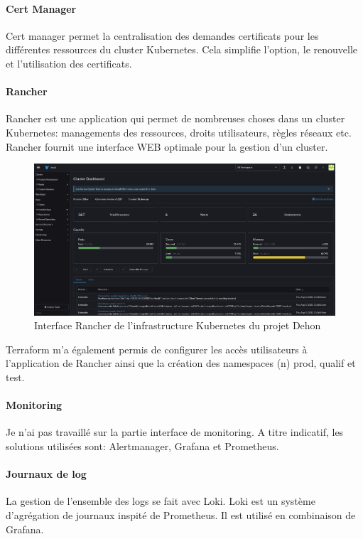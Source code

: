 \documentclass[12pt]{article}
\begin{document}
\paragraph{Cert Manager}
Cert manager permet la centralisation des demandes certificats pour les différentes ressources du \gls{cluster} \gls{Kubernetes}.
Cela simplifie l'option, le renouvelle et l'utilisation des certificats.

\paragraph{Rancher}
Rancher est une application qui permet de nombreuses choses dans un \gls{cluster} \gls{Kubernetes}: managements des ressources, droits utilisateurs, règles réseaux etc. 
Rancher fournit une interface WEB optimale pour la gestion d'un \gls{cluster}.

\begin{figure}[!ht]
    \centering
        \includegraphics[width=\textwidth]{src/rancher_interface.png}
    \caption{Interface Rancher de l'infrastructure \gls{Kubernetes} du projet Dehon}
    \label{fig:rancher_interface}
\end{figure}

Terraform m'a également permis de configurer les accès utilisateurs à l'application de Rancher ainsi que la création des namespaces (n) prod, qualif et test.

\paragraph{Monitoring}
Je n'ai pas travaillé sur la partie interface de monitoring.
A titre indicatif, les solutions utilisées sont: Alertmanager, Grafana et Prometheus.

\paragraph{Journaux de log}
La gestion de l'ensemble des logs se fait avec Loki.
Loki est un système d'agrégation de journaux inspité de Prometheus.
Il est utilisé en combinaison de Grafana.
\end{document}
